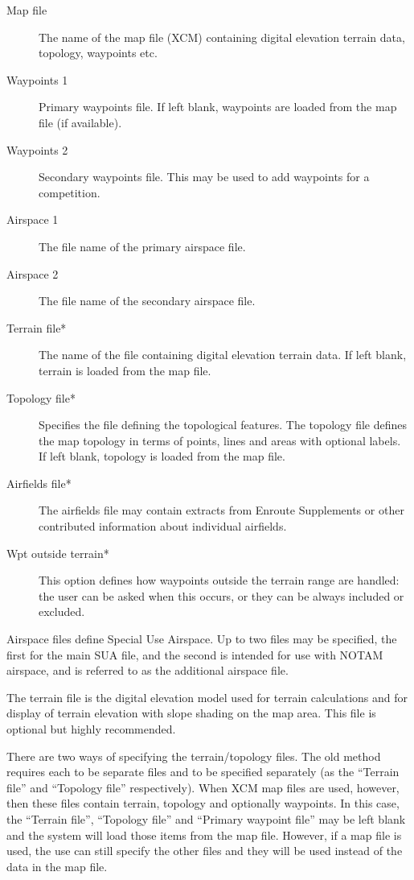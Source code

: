 \documentclass[a4paper,12pt]{refrep}
\begin{document}
\begin{description}
\item[Map file]  The name of the map file (XCM) containing digital elevation
  terrain data, topology, waypoints etc.
\item[Waypoints 1]
Primary waypoints file.  If left blank, waypoints are loaded from the map file
(if available).
\item[Waypoints 2]
Secondary waypoints file.  This may be used to add waypoints for a competition.
\item[Airspace 1] The file name of the primary airspace file.
\item[Airspace 2] The file name of the secondary airspace file.
\item[Terrain file*]  The name of the file containing digital elevation
  terrain data.  If left blank, terrain is loaded from the map file.
\item[Topology file*]  Specifies the file defining the topological features.
The topology file defines the map topology in terms of points, lines
and areas with optional labels.  If left blank, topology is loaded from the map file.
\item[Airfields file*]
The airfields file may contain extracts from Enroute Supplements or
other contributed information about individual airfields.
\item[Wpt outside terrain*] This option defines how waypoints outside the 
  terrain range are handled: the user can be asked when this occurs,
  or they can be always included or excluded.
\end{description}

Airspace files define Special Use Airspace.  Up to two files may be
specified, the first for the main SUA file, and the second is intended
for use with NOTAM airspace, and is referred to as the additional
airspace file.

The terrain file is the digital elevation model used for terrain
calculations and for display of terrain elevation with slope shading
on the map area.  This file is optional but highly recommended.

There are two ways of specifying the terrain/topology files.  The old
method requires each to be separate files and to be specified
separately (as the ``Terrain file'' and ``Topology file''
respectively).  When XCM map files are used, however, then these files
contain terrain, topology and optionally waypoints.  In this case, the
``Terrain file'', ``Topology file'' and ``Primary waypoint file'' may
be left blank and the system will load those items from the map file.
However, if a map file is used, the use can still specify the other
files and they will be used instead of the data in the map file.
\end{document}
